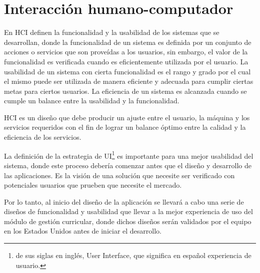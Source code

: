 \section{Interacción humano-computador}
En HCI definen la funcionalidad y la usabilidad de los sistemas que se desarrollan, donde la funcionalidad de un sistema es definida por un conjunto de acciones o servicios que son proveídas a los usuarios, sin embargo, el valor de la funcionalidad es verificada cuando es eficientemente utilizada por el usuario\citep{shneiderman_designing_2010}. La usabilidad de un sistema con cierta funcionalidad es el rango y grado por el cual el mismo puede ser utilizada de manera eficiente y adecuada para cumplir ciertas metas para ciertos usuarios. La eficiencia de un sistema es alcanzada cuando se cumple un balance entre la usabilidad y la funcionalidad\citep{nielsen_usability_2010}.

HCI es un diseño que debe producir un ajuste entre el usuario, la máquina y los servicios requeridos con el fin de lograr un balance óptimo entre la calidad y la eficiencia de los servicios.

La definición de la estrategia de UI\footnote{de sus siglas en inglés, User Interface, que significa en español experiencia de usuario.} es importante para una mejor usabilidad del sistema, donde este proceso debería comenzar antes que el diseño y desarrollo de las aplicaciones. Es la visión de una solución que necesite ser verificado con potenciales usuarios que prueben que necesite el mercado\citep{levy_ux_2015}.

Por lo tanto, al inicio del diseño de la aplicación se llevará a cabo una serie de diseños de funcionalidad y usabilidad que llevar a la mejor experiencia de uso del módulo de gestión curricular, donde dichos diseños serán validados por el equipo en los Estados Unidos antes de iniciar el desarrollo.